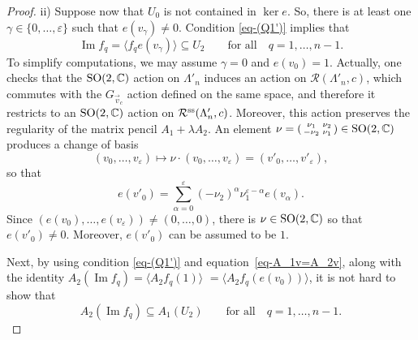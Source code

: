 \documentclass[pdftex]{sigma}
\numberwithin{equation}{section}
\begin{document}
\begin{proof}
 ii) Suppose now that $U_{0}$ is not contained in $\ker e$. So, there is at least one $\gamma\in \{0,\dots, \varepsilon\}$ such that
 $e(v_\gamma) \neq 0$. Condition \eqref{eq-(Q1')} implies that
 \begin{equation}
\operatorname{Im} f_{q}= \langle f_{q}e(v_{\gamma})\rangle \subseteq U_{2}\qquad\text{for all}\quad q=1,\dots,n-1 .
\label{eq-imf-in-V}
\end{equation}
To simplify computations, we may assume $\gamma =0$ and $e(v_0)=1$.
 Actually, one checks that the ${\rm SO}(2,\mathbb{C})$ action on $\Lambda'_n$ induces an action on $\mathcal{R}(\Lambda'_{n}, c)$, which commutes with the $G_{\vec{v}_c}$ action defined on the same space, and therefore it restricts to an ${\rm SO}(2,\mathbb{C})$ action on $\mathcal{R}^{\rm ss}(\Lambda'_{n}, c)$. Moreover, this action preserves the regularity of the matrix pencil
 $A_1 + \lambda A_2$. An element $\nu= \left(\begin{smallmatrix} \nu_1 & \nu_2 \\ -\nu_2 & \nu_1\end{smallmatrix}\right)\in {\rm SO}(2,\mathbb{C})$ produces a change of basis
 \[(v_0, \dots, v_{\varepsilon}) \mapsto \nu \cdot (v_0, \dots, v_{\varepsilon}) = (v'_0, \dots, v'_{\varepsilon}) ,\]
 so that
\begin{equation*}
e(v'_{0})=\sum_{\alpha=0}^{\varepsilon}(-\nu_{2})^{\alpha}\nu_{1}^{\varepsilon-\alpha}e(v_{\alpha}) .
\end{equation*}
Since $(e(v_{0}),\dots,e(v_{\varepsilon}))\neq(0,\dots,0)$, there is $\nu\in {\rm SO}(2, \mathbb{C})$ so that $e(v'_{0})\neq0$. Moreover, $e(v'_0)$ can be assumed to be $1$.

Next, by using condition \eqref{eq-(Q1')} and equation~\eqref{eq-A_1v=A_2v}, along with the identity
$A_{2}(\operatorname{Im} f_{q}) =\langle A_{2}f_{q}(1)\rangle$ $ = \langle A_{2}f_{q}(e(v_0))\rangle$, it is not hard to show that
\begin{equation}
A_{2}(\operatorname{Im} f_{q})\subseteq A_{1}(U_{2})\qquad\text{for all}\quad q=1,\dots,n-1 .
\label{eq-A_2(im-f)}
\end{equation}



\end{proof}
\end{document}
